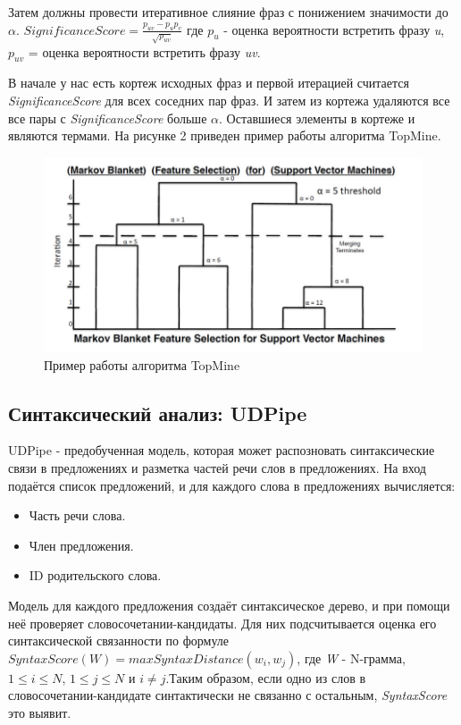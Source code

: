 Затем должны провести итеративное слияние фраз с понижением значимости до $\alpha$.
$SignificanceScore = \frac{p_{uv}-p_{u}p_{v}}{\sqrt{p_{uv}}}$
где $p_{u}$ - оценка вероятности встретить фразу \textit{u}, $p_{uv}$ = оценка вероятности встретить фразу \textit{uv}.

В начале у нас есть кортеж исходных фраз и первой итерацией считается \textit{SignificanceScore} для всех соседних пар фраз. И затем из кортежа удаляются все все пары с \textit{SignificanceScore} больше $\alpha$. Оставшиеся элементы в кортеже и являются термами. На рисунке 2 приведен пример работы алгоритма TopMine.
\begin{figure}
    \includegraphics[scale = 0.5]{images/ml2.png}
    \caption{Пример работы алгоритма TopMine}
\end{figure}
\subsection*{Синтаксический анализ: UDPipe}

UDPipe - предобученная модель, которая может распозновать синтаксические связи в предложениях и разметка частей речи слов в предложениях. На вход подаётся список предложений, и для каждого слова в предложениях вычисляется:

\begin{itemize}
	\item Часть речи слова.
	\item Член предложения.
	\item ID родительского слова.
\end{itemize}

Модель для каждого предложения создаёт синтаксическое дерево, и при помощи неё проверяет словосочетании-кандидаты. Для них подсчитывается оценка его синтаксической связанности по формуле $SyntaxScore(W) = max SyntaxDistance(w_{i}, w_{j})$, где \textit{W} - N-грамма, $1 \leq i \leq N$, $1 \leq j \leq N$ и $i \neq j$.Таким образом, если одно из слов в словосочетании-кандидате синтактически не связанно с остальным, \textit{SyntaxScore} это выявит.

